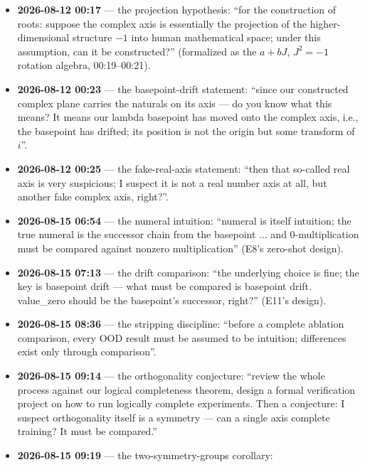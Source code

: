 \documentclass[sigplan,10pt,anonymous,review]{acmart}
\begin{document}
\begin{itemize}
cannot construct the prime axis, but we can construct the complex axis
from lambda calculus, right? Note I want the \emph{true} complex axis, not
the fake one where each successor is the natural 1'' (the user rejects
axes whose successor is pre-assumed to be the natural numbers; the true
axis is multiplicative iteration --- rotation-scaling orbits).
\item \textbf{2026-08-12 00:17} --- the projection hypothesis: ``for the
construction of roots: suppose the complex axis is essentially the
projection of the higher-dimensional structure $-1$ into human
mathematical space; under this assumption, can it be constructed?''
(formalized as the $a+bJ$, $J^2=-1$ rotation algebra, 00:19--00:21).
\item \textbf{2026-08-12 00:23} --- the basepoint-drift statement: ``since
our constructed complex plane carries the naturals on its axis --- do you
know what this means? It means our lambda basepoint has moved onto the
complex axis, i.e., the basepoint has drifted; its position is not the
origin but some transform of $i$''.
\item \textbf{2026-08-12 00:25} --- the fake-real-axis statement: ``then
that so-called real axis is very suspicious; I suspect it is not a real
number axis at all, but another fake complex axis, right?''.
\item \textbf{2026-08-15 06:54} --- the numeral intuition: ``numeral is
itself intuition; the true numeral is the successor chain from the
basepoint ... and 0-multiplication must be compared against nonzero
multiplication'' (E8's zero-shot design).
\item \textbf{2026-08-15 07:13} --- the drift comparison: ``the underlying
choice is fine; the key is basepoint drift --- what must be compared is
basepoint drift. value\_zero should be the basepoint's successor, right?''
(E11's design).
\item \textbf{2026-08-15 08:36} --- the stripping discipline: ``before a
complete ablation comparison, every OOD result must be assumed to be
intuition; differences exist only through comparison''.
\item \textbf{2026-08-15 09:14} --- the orthogonality conjecture: ``review
the whole process against our logical completeness theorem, design a
formal verification project on how to run logically complete experiments.
Then a conjecture: I suspect orthogonality itself is a symmetry --- can a
single axis complete training? It must be compared.''
\item \textbf{2026-08-15 09:19} --- the two-symmetry-groups corollary:

\end{itemize}
\end{document}
